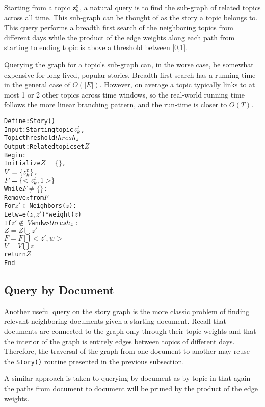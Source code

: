 \documentclass[10pt,twocolumn]{article}
\begin{document}
Starting from a topic $\mathbf{z_k^t}$, a natural query is to find the sub-graph of related topics across all time.  This sub-graph can be thought of as the story a topic belongs to.  This query performs a breadth first search of the neighboring topics from different days while the product of the edge weights along each path from starting to ending topic is above a threshold between [0,1].   

Querying the graph for a topic's sub-graph can, in the worse case, be somewhat expensive for long-lived, popular stories.  Breadth first search has a running time in the general case of $O(|E|)$.  However, on average a topic typically links to at most 1 or 2 other topics across time windows, so the real-world running time follows the more linear branching pattern, and the run-time is closer to $O(T)$.

\begin{framed}
\begin{center}
\begin{alltt}
Define: Story()
Input:  Starting topic \(z\sb{k}\sp{t}\), 
        Topic threshold \(thresh\sb{z}\)
Output: Related topic set \(Z\)
Begin:
  Initialize \(Z = \{\}\),             
             \(V = \{z\sb{k}\sp{t}\}\),
             \(F = \{<z\sb{k}\sp{t}, 1>\}\)
  While \(F \ne \{\}\):
     Remove \(z\) from \(F\)
     For \(z' \in\) Neighbors(\(z\)):
       Let w = e(\(z, z'\))*weight(\(z\))
       If \(z' \not\in\ V\) and w > \(thresh\sb{z}\):
         \(Z = Z \bigcup z'\)
         \(F = F \bigcup <z', w> \)
     \(V = V \bigcup z\)
  return \(Z\)
End
\end{alltt}
\end{center}
\end{framed}


\subsection {Query by Document}
Another useful query on the story graph is the more classic problem of finding relevant neighboring documents given a starting document.  Recall that documents are connected to the graph only through their topic weights and that the interior of the graph is entirely edges between topics of different days.  Therefore, the traversal of the graph from one document to another may reuse the \texttt{Story()} routine presented in the previous subsection.

A similar approach is taken to querying by document as by topic in that again the paths from document to document will be pruned by the product of the edge weights.
\end{document}
